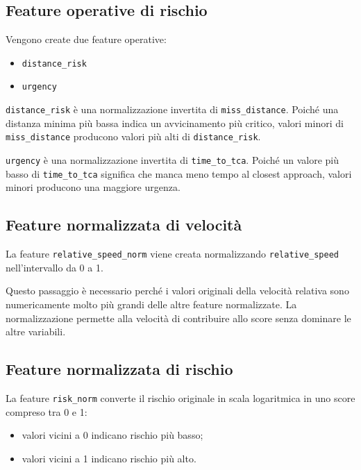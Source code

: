 \documentclass[12pt,a4paper]{article}
\begin{document}
\subsection{Feature operative di rischio}

Vengono create due feature operative:

\begin{itemize}
    \item \texttt{distance\_risk}
    \item \texttt{urgency}
\end{itemize}

\texttt{distance\_risk} è una normalizzazione invertita di \texttt{miss\_distance}. Poiché una distanza minima più bassa indica un avvicinamento più critico, valori minori di \texttt{miss\_distance} producono valori più alti di \texttt{distance\_risk}.

\texttt{urgency} è una normalizzazione invertita di \texttt{time\_to\_tca}. Poiché un valore più basso di \texttt{time\_to\_tca} significa che manca meno tempo al closest approach, valori minori producono una maggiore urgenza.

\subsection{Feature normalizzata di velocità}

La feature \texttt{relative\_speed\_norm} viene creata normalizzando \texttt{relative\_speed} nell'intervallo da 0 a 1.

Questo passaggio è necessario perché i valori originali della velocità relativa sono numericamente molto più grandi delle altre feature normalizzate. La normalizzazione permette alla velocità di contribuire allo score senza dominare le altre variabili.

\subsection{Feature normalizzata di rischio}

La feature \texttt{risk\_norm} converte il rischio originale in scala logaritmica in uno score compreso tra 0 e 1:

\begin{itemize}
    \item valori vicini a 0 indicano rischio più basso;
    \item valori vicini a 1 indicano rischio più alto.
\end{itemize}
\end{document}
